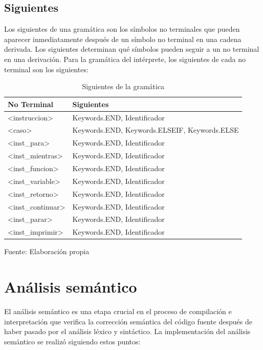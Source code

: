\subsection{Siguientes}
Los siguientes de una gramática son los símbolos no terminales que pueden aparecer inmediatamente después de un símbolo no terminal en una cadena derivada. Los siguientes determinan qué símbolos pueden seguir a un no terminal en una derivación. Para la gramática del intérprete, los siguientes de cada no terminal son los siguientes:
\begin{table}[!h]
  \begin{center}
    \begin{tabularx}{1\textwidth}{|X|X|}
      \hline
      \textbf{No Terminal} & \textbf{Siguientes} \\
      \hline
      <instruccion> & Keywords.END, Identificador \\
      \hline
      <caso> & Keywords.END, Keywords.ELSEIF, Keywords.ELSE \\
      \hline
      <inst\_para> & Keywords.END, Identificador \\
      \hline
      <inst\_mientras> & Keywords.END, Identificador \\
      \hline
      <inst\_funcion> & Keywords.END, Identificador \\
      \hline
      <inst\_variable> & Keywords.END, Identificador \\
      \hline
      <inst\_retorno> & Keywords.END, Identificador \\
      \hline
      <inst\_continuar> & Keywords.END, Identificador \\
      \hline
      <inst\_parar> & Keywords.END, Identificador \\
      \hline
      <inst\_imprimir> & Keywords.END, Identificador \\
      \hline
    \end{tabularx}
  \end{center}
  \caption{Siguientes de la gramática}
  \centering Fuente: Elaboración propia
  \label{tab:siguientes}
\end{table}

\section{Análisis semántico}
El análisis semántico es una etapa crucial en el proceso de compilación e interpretación que verifica la corrección semántica del código fuente después de haber pasado por el análisis léxico y sintáctico. La implementación del análisis semántico se realizó siguiendo estos puntos:


